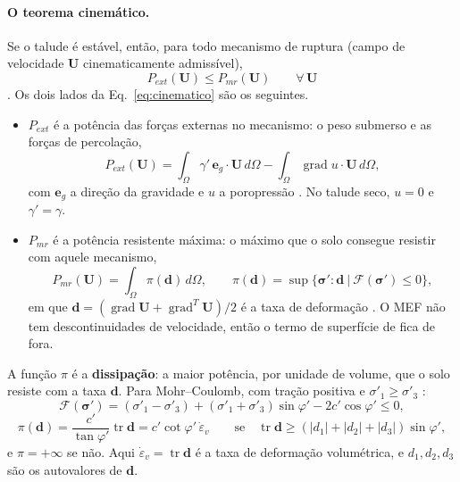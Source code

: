 \documentclass[11pt,a4paper]{article}
\newcommand{\Fy}{\mathcal{F}}
\begin{document}
\paragraph{O teorema cinemático.} Se o talude é estável, então, para todo mecanismo de ruptura (campo de velocidade
$\bm U$ cinematicamente admissível),
\begin{equation}
  P_{ext}(\bm U) \le P_{mr}(\bm U) \qquad \forall\,\bm U
  \label{eq:cinematico}
\end{equation}
\citep[Eq.~7]{ceron2025}. Os dois lados da Eq.~\eqref{eq:cinematico} são os seguintes.
\begin{itemize}
  \item $P_{ext}$ é a potência das forças externas no mecanismo: o peso submerso e as forças de percolação,
    \begin{equation}
      P_{ext}(\bm U) = \int_\Omega \gamma'\,\bm e_g\cdot\bm U\,d\Omega - \int_\Omega \operatorname{grad} u\cdot\bm U\,d\Omega,
      \label{eq:pext}
    \end{equation}
    com $\bm e_g$ a direção da gravidade e $u$ a poropressão \citep[Eqs.~8 e 47]{ceron2025}. No talude seco, $u = 0$
    e $\gamma' = \gamma$.
  \item $P_{mr}$ é a potência resistente máxima: o máximo que o solo consegue resistir com aquele mecanismo,
    \begin{equation}
      P_{mr}(\bm U) = \int_\Omega \pi(\bm d)\,d\Omega, \qquad
      \pi(\bm d) = \sup\big\{\bm\sigma':\bm d \ \big|\ \Fy(\bm\sigma') \le 0\big\},
      \label{eq:pmr}
    \end{equation}
    em que $\bm d = (\operatorname{grad}\bm U + \operatorname{grad}^T\bm U)/2$ é a taxa de deformação
    \citep[Eqs.~9 e 10]{ceron2025}. O MEF não tem descontinuidades de velocidade, então o termo de superfície de
    \citet{ceron2025} fica de fora.
\end{itemize}
A função $\pi$ é a \textbf{dissipação}: a maior potência, por unidade de volume, que o solo resiste com a taxa
$\bm d$. Para Mohr--Coulomb, com tração positiva e $\sigma'_1 \ge \sigma'_3$ \citep[Eqs.~13 e 14]{ceron2025}:
\begin{equation}
  \Fy(\bm\sigma') = (\sigma'_1 - \sigma'_3) + (\sigma'_1 + \sigma'_3)\sin\varphi' - 2c'\cos\varphi' \le 0,
  \label{eq:mc}
\end{equation}
\begin{equation}
  \pi(\bm d) = \frac{c'}{\tan\varphi'}\operatorname{tr}\bm d = c'\cot\varphi'\,\dot\varepsilon_v
  \qquad\text{se}\quad \operatorname{tr}\bm d \ge (|d_1| + |d_2| + |d_3|)\sin\varphi',
  \label{eq:pi}
\end{equation}
e $\pi = +\infty$ se não. Aqui $\dot\varepsilon_v = \operatorname{tr}\bm d$ é a taxa de deformação volumétrica, e
$d_1, d_2, d_3$ são os autovalores de $\bm d$.
\end{document}
